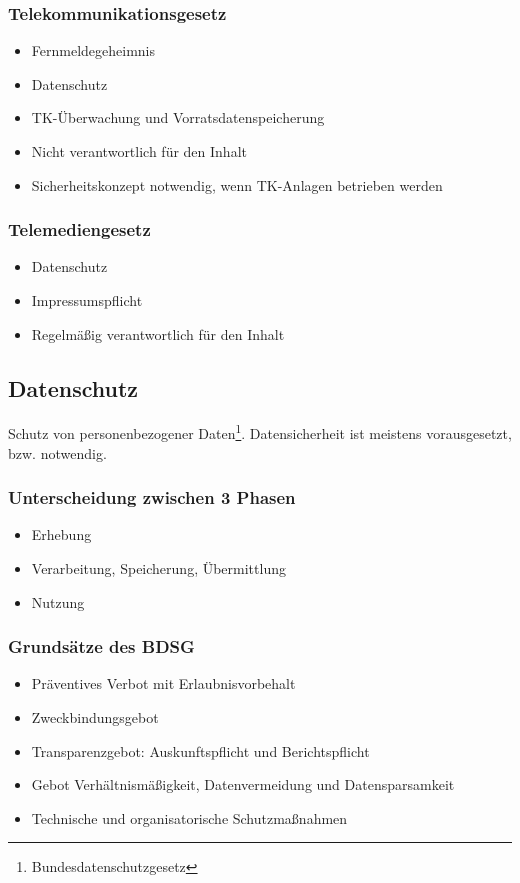 \subsubsection{Telekommunikationsgesetz}
\begin{itemize}
	\item Fernmeldegeheimnis
	\item Datenschutz
	\item TK-Überwachung und Vorratsdatenspeicherung
	\item Nicht verantwortlich für den Inhalt
	\item Sicherheitskonzept notwendig, wenn TK-Anlagen betrieben werden
\end{itemize}

\subsubsection{Telemediengesetz}
\begin{itemize}
	\item Datenschutz
	\item Impressumspflicht
	\item Regelmäßig verantwortlich für den Inhalt
\end{itemize}


\subsection{Datenschutz}
Schutz von personenbezogener Daten\footnote{Bundesdatenschutzgesetz}. Datensicherheit ist meistens vorausgesetzt, bzw. notwendig.

\subsubsection{Unterscheidung zwischen 3 Phasen}
\begin{itemize}
	\item Erhebung
	\item Verarbeitung, Speicherung, Übermittlung
	\item Nutzung
\end{itemize}

\subsubsection{Grundsätze des BDSG}
\begin{itemize}
	\item Präventives Verbot mit Erlaubnisvorbehalt
	\item Zweckbindungsgebot
	\item Transparenzgebot: Auskunftspflicht und Berichtspflicht
	\item Gebot Verhältnismäßigkeit, Datenvermeidung und Datensparsamkeit
	\item Technische und organisatorische Schutzmaßnahmen
\end{itemize}


